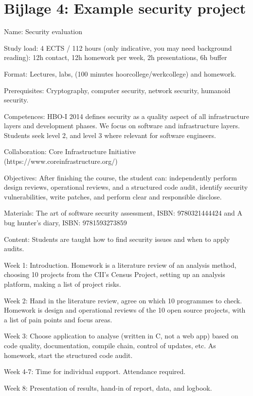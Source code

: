 \section*{Bijlage 4: Example security project}

Name: Security evaluation

Study load: 4 ECTS / 112 hours (only indicative, you may need background reading): 12h contact, 12h homework per week, 2h presentations, 6h buffer

Format: Lectures, labs, (100 minutes hoorcollege/werkcollege) and homework.

Prerequisites: Cryptography, computer security, network security, humanoid security.

Competences: HBO-I 2014 defines security as a quality aspect of all infrastructure layers and development phases. We focus on software and infrastructure layers. Students seek level 2, and level 3 where relevant for software engineers.

Collaboration: Core Infrastructure Initiative (https://www.coreinfrastructure.org/)

Objectives: After finishing the course, the student can: independently perform design reviews, operational reviews, and a structured code audit, identify security vulnerabilities, write patches, and perform clear and responsible disclose.

Materials: The art of software security assessment, ISBN: 9780321444424 and A bug hunter’s diary, ISBN: 9781593273859

Content: Students are taught how to find security issues and when to apply audits.

Week 1: Introduction. Homework is a literature review of an analysis 	method, choosing 10 projects from the CII’s Census Project, setting up an analysis platform, making a list of project risks.

Week 2: Hand in the literature review, agree on which 10 programmes to check. Homework is design and operational reviews of the 10 open source projects, with a list of pain points and focus areas.

Week 3: Choose application to analyse (written in C, not a web app) based on code quality, documentation, compile chain, control of updates, etc. As homework, start the structured code audit.

Week 4-7: Time for individual support. Attendance required.

Week 8: Presentation of results, hand-in of report, data, and logbook.